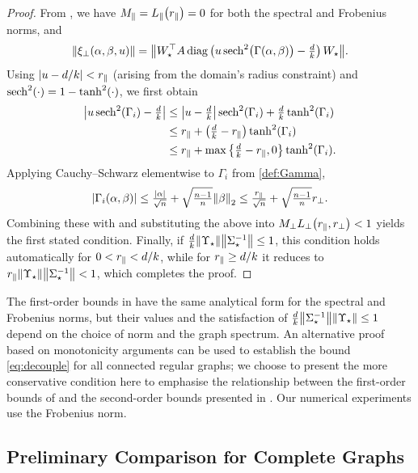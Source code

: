 \documentclass[a4paper]{cas-dc}
\begin{document}
\begin{proof}
    From \cite[Section~V]{gupta2025bounds}, we have \(M_{\parallel}=L_{\parallel}\bigl(r_{\parallel}\bigr)=0\) for both the spectral and Frobenius norms, and
    \begin{equation*}
        \norm{\xipp{u}} = \norm{\W^{\top}A\diag\left(u\sech^2\bigl(\Gamma(\A,\B)\bigr) - \tfrac{d}{k}\right)\W}.
    \end{equation*}
    Using \(\abs{u-d/k}<r_{\parallel}\) (arising from the domain's radius constraint) and \(\sech^2(\cdot) = 1 - \tanh^2(\cdot)\), we first obtain
    \begin{align*}
        \abs{u\sech^2(\Gamma_i)-\tfrac{d}{k}} &\le \abs{u-\tfrac{d}{k}}\sech^2(\Gamma_i) +\tfrac{d}{k}\tanh^2(\Gamma_i) \\
        &\le \rpr+\left(\tfrac{d}{k}-\rpr\right) \tanh^2(\Gamma_i) \\
        &\le \rpr+\max\left\{\tfrac{d}{k}-\rpr,0\right\} \tanh^2(\Gamma_i).
    \end{align*}
    Applying Cauchy--Schwarz elementwise to \(\Gamma_i\) from \eqref{def:Gamma},
    \begin{equation*}
        \abs{\Gamma_i(\alpha,\beta)} \le \tfrac{\abs{\alpha}}{\sqrt n} + \sqrt{\tfrac{n-1}{n}}\norm{\beta}_2 \le \tfrac{r_{\parallel}}{\sqrt n} +\sqrt{\tfrac{n-1}{n}}r_{\perp}.
    \end{equation*}
    Combining these with  and substituting the above into \(M_{\perp}L_{\perp}\bigl(r_{\parallel},r_{\perp}\bigr)<1\) yields the first stated condition. Finally, if \(\frac{d}{k}\norm{\Upsilon_{\star }}\norm{\Sigma_{\star }^{-1}} \le 1\), this condition holds automatically for \(0 < r_{\parallel} < d/k\), while for \(r_{\parallel} \ge d/k\) it reduces to \(r_{\parallel}\norm{\Upsilon_{\star }}\norm{\Sigma_{\star }^{-1}}<1\), which completes the proof.
\end{proof}
\begin{remark}
    The first-order bounds in  have the same analytical form for the spectral and Frobenius norms, but their values and the satisfaction of \(\frac{d}{k}\norm{\Sigma_{\star }^{-1}}\norm{\Upsilon_{\star }} \le 1\) depend on the choice of norm and the graph spectrum. An alternative proof based on monotonicity arguments can be used to establish the bound \eqref{eq:decouple} for all connected regular graphs; we choose to present the more conservative condition here to emphasise the relationship between the first-order bounds of  and the second-order bounds presented in . Our numerical experiments use the Frobenius norm.
\end{remark}


\subsection{Preliminary Comparison for Complete Graphs}
\label{ssec:conservative}
\end{document}
